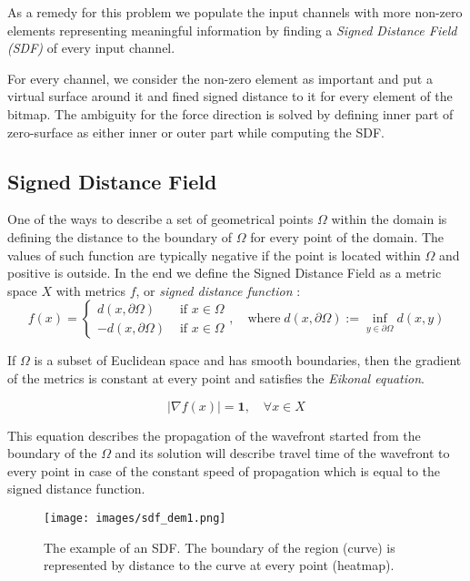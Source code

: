 As a remedy for this problem we populate the input channels with more non-zero elements representing meaningful information by finding a \emph{Signed Distance Field (SDF)} of every input channel\cite{}.
\medskip

For every channel, we consider the non-zero element as important and put a virtual surface around it and fined signed distance to it for every element of the bitmap.
The ambiguity for the force direction is solved by defining inner part of zero-surface as either inner or outer part while computing the SDF.
\medskip

\subsection{Signed Distance Field}

One of the ways to describe a set of geometrical points $\Omega$ within the domain is defining the distance to the boundary of $\Omega$ for every point of the domain. 
The values of such function are typically negative if the point is located within $\Omega$ and positive is outside.
In the end we define the Signed Distance Field as a metric space $X$ with metrics $f$, or \emph{signed distance function} :    
\[ 
f(x) = 
	\begin{cases}
			d(x, \partial \Omega) & \mbox{ if } x\in\Omega  \\
			-d(x, \partial \Omega) & \mbox{ if } x\in\Omega 
	\end{cases} 
	, \quad \mathrm{where} \; d(x, \partial \Omega) := \inf_{y \in \partial \Omega}d(x, y)
\]

If $\Omega$ is a subset of Euclidean space and has smooth boundaries, then the gradient of the metrics is constant at every point and satisfies the \emph{Eikonal equation}.
\medskip

\[
 |\nabla f(x)| = \mathbf{1}, \quad \forall x \in X
\]

This equation describes the propagation of the wavefront started from the boundary of the $\Omega$ and its solution will describe travel time of the wavefront to every point in case of the constant speed of propagation which is equal to the signed distance function.
\medskip
\begin{figure}
	\centering
	\texttt{[image: images/sdf\_dem1.png]}
	\label{fig:sdf_ex}
	\caption{The example of an SDF. The boundary of the region (curve) is represented by distance to the curve at every point (heatmap).  }
\end{figure}
\medskip

